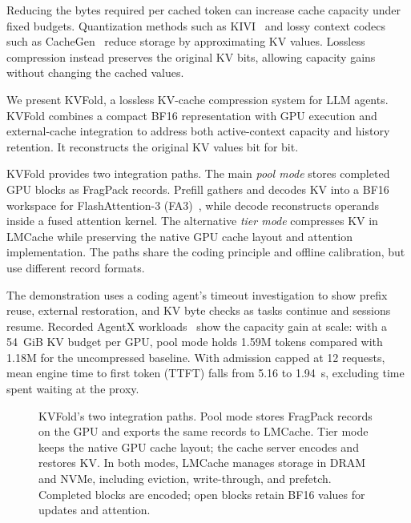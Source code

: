 \documentclass[conference]{IEEEtran}
\begin{document}
Reducing the bytes required per cached token can increase cache capacity
under fixed budgets. Quantization methods such as KIVI~\cite{kivi} and
lossy context codecs such as CacheGen~\cite{cachegen} reduce storage by
approximating KV values. Lossless compression instead preserves the
original KV bits, allowing capacity gains without changing the cached
values.

We present KVFold, a lossless KV-cache compression system for LLM agents.
KVFold combines a compact BF16 representation with GPU execution and
external-cache integration to address both active-context capacity and
history retention. It reconstructs the original KV values bit for bit.

KVFold provides two integration paths. The main \emph{pool mode} stores
completed GPU blocks as FragPack records. Prefill gathers and decodes KV
into a BF16 workspace for FlashAttention-3 (FA3)~\cite{fa3}, while decode
reconstructs operands inside a fused attention kernel. The alternative
\emph{tier mode} compresses KV in LMCache while preserving the native GPU
cache layout and attention implementation. The paths share the coding
principle and offline calibration, but use different record formats.

The demonstration uses a coding agent's timeout investigation to show
prefix reuse, external restoration, and KV byte checks as tasks continue
and sessions resume.
Recorded AgentX workloads~\cite{agentx} show the capacity gain at scale:
with a 54~GiB KV budget per GPU, pool mode holds 1.59M tokens compared
with 1.18M for the uncompressed baseline. With admission capped at
12 requests, mean engine time to first token (TTFT) falls from 5.16 to
1.94~s, excluding time spent waiting at the proxy.

\begin{figure}[t]
\centering

\caption{KVFold's two integration paths. Pool mode stores FragPack records
on the GPU and exports the same records to LMCache. Tier mode keeps the
native GPU cache layout; the cache server encodes and restores KV.
In both modes, LMCache manages storage in DRAM and NVMe, including eviction,
write-through, and prefetch. Completed blocks are encoded; open blocks retain
BF16 values for updates and attention.}
\label{fig:architecture}
\end{figure}
\end{document}

